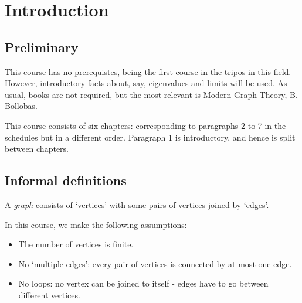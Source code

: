 \documentclass{article}
\begin{document}
\maketitle

\section{Introduction}

\subsection{Preliminary}
This course has no prerequistes, being the first course in the tripos in this field.  However, introductory facts about, say, eigenvalues and limits will be used.
As usual, books are not required, but the most relevant is Modern Graph Theory, B. Bollobas.

This course consists of six chapters: corresponding to paragraphs 2 to 7 in the schedules but in a different order. Paragraph 1 is introductory, and hence is split between chapters.

\subsection{Informal definitions}
A \emph{graph} consists of `vertices' with some pairs of vertices joined by `edges'.
\begin{center}
\end{center}
In this course, we make the following assumptions:
\begin{itemize}
    \item The number of vertices is finite.
    \item No `multiple edges': every pair of vertices is connected by at most one edge.
    \item No loops: no vertex can be joined to itself - edges have to go between different vertices.
\end{itemize}
\end{document}
